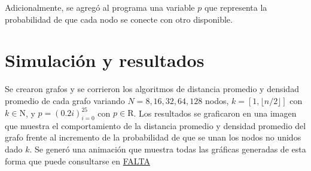 \documentclass{article}
\begin{document}
  Adicionalmente, se agregó al programa una variable $p$ que representa la probabilidad de que cada nodo se conecte con otro disponible.

  \section{Simulación y resultados}

  Se crearon grafos y se corrieron los algoritmos de distancia promedio y densidad promedio de cada grafo variando $N = {8, 16, 32, 64, 128}$ nodos, $k = [1, \lfloor n / 2 \rfloor]$ con $k \in \mathrm{N}$, y $p = (0.2i)_{i= 0}^{25}$ con $p \in \mathrm{R}$. Los resultados se graficaron en una imagen que muestra el comportamiento de la distancia promedio y densidad promedio del grafo frente al incremento de la probabilidad de que se unan los nodos no unidos dado $k$. Se generó una animación que muestra todas las gráficas generadas de esta forma que puede consultarse en \url{FALTA}


  {}
  
\end{document}
